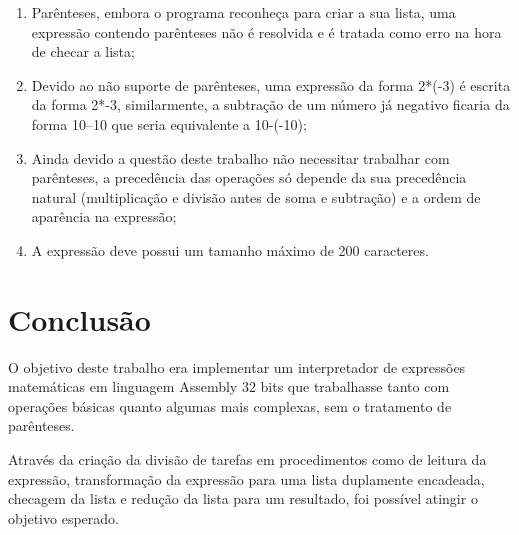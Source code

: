 \documentclass[12pt]{article}
\begin{document}
\begin{enumerate}
\item Parênteses, embora o programa reconheça para criar a sua lista, uma expressão contendo parênteses não é resolvida e é tratada como erro na hora de checar a lista;
\item Devido ao não suporte de parênteses, uma expressão da forma 2*(-3) é escrita da forma 2*-3, similarmente, a subtração de um número já negativo ficaria da forma 10--10 que seria equivalente a 10-(-10);
\item Ainda devido a questão deste trabalho não necessitar trabalhar com parênteses, a precedência das operações só depende da sua precedência natural (multiplicação e divisão antes de soma e subtração) e a ordem de aparência na expressão;
\item A expressão deve possui um tamanho máximo de 200 caracteres.
\end{enumerate}

\section*{Conclusão}

O objetivo deste trabalho era implementar um interpretador de expressões matemáticas em linguagem Assembly 32 bits que trabalhasse tanto com  operações básicas quanto algumas mais complexas, sem o tratamento de parênteses.

Através da criação da divisão de tarefas em procedimentos como de leitura da expressão, transformação da expressão para uma lista duplamente encadeada, checagem da lista e redução da lista para um resultado, foi possível atingir o objetivo esperado.

\nocite{*}



\end{document}
